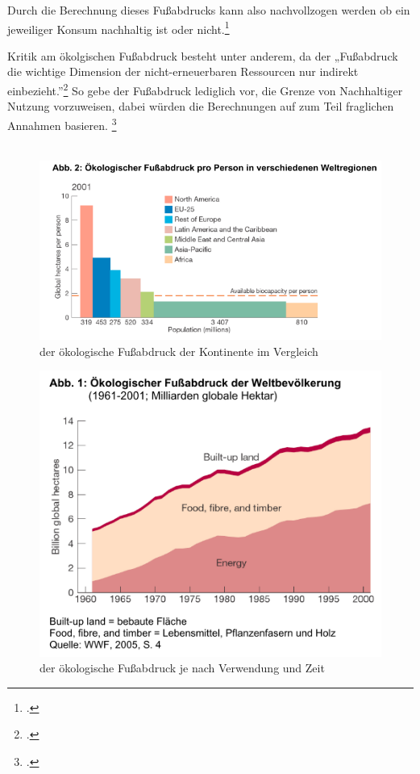 \documentclass{scrartcl}
\begin{document}
Durch die Berechnung dieses Fußabdrucks kann also nachvollzogen werden ob ein jeweiliger Konsum nachhaltig ist oder nicht.\footcite[S.192]{AntjeFlade2015StadtStadtforschung}

Kritik am ökolgischen Fußabdruck besteht unter anderem, da der „Fußabdruck die wichtige Dimension der nicht-erneuerbaren Ressourcen nur indirekt einbezieht.”\footcite[S.3]{StefanGiljum2007WissenschaftlicheFuabdruck} So gebe der Fußabdruck lediglich vor, die Grenze von Nachhaltiger Nutzung vorzuweisen, dabei würden die Berechnungen auf zum Teil fraglichen Annahmen basieren. \footcite[Vgl.][S.3f]{StefanGiljum2007WissenschaftlicheFuabdruck}
\\
\\
\begin{figure}[htbp]
\centering
\includegraphics[width=12cm]{image_folder/oekFussabdruckWelt.png}
\caption{der ökologische Fußabdruck der Kontinente im Vergleich}
\label{fig:oekFussabdruckWelt}
\end{figure}

\begin{figure}[htbp]
\centering
\includegraphics[width=12cm]{image_folder/oekFussabdruckZeit.png}
\caption{der ökologische Fußabdruck je nach Verwendung und Zeit}
\label{fig: oekFussabdruckZeit}
\end{figure}
\end{document}
